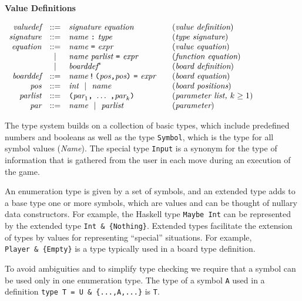 \documentclass[11pt]{article}
\makeatletter
\newcommand{\prodName}[1]{&(\emph{#1})\\}
\newcommand{\nt}[1]{\textit{#1}}
\newcommand{\prog}[1]{\texttt{#1}}
\newcommand{\ORil}{\ \ |\ \ }
\newcommand{\IS}{&::=&}
\newcommand{\OR}{&|&}
\newcommand{\syntax}[2]{
  \needspace{3\baselineskip}
  \bigskip\par\noindent\textbf{#1}\par\smallskip%
  $\begin{array}{rcl@{\qquad}l}#2\end{array}$%
  \par\bigskip\noindent\ignorespaces
}
\newcommand{\lp}{\prog{(}}
\newcommand{\rp}{\prog{)}}
\newcommand{\paren}[1]{\lp#1\rp}
\newcommand{\pair}[2]{\paren{#1\prog{,}#2}}
\makeatother
\begin{document}
\syntax{Value Definitions}{
\nt{valuedef}  \IS \nt{signature}\ \nt{equation}   \prodName{value definition}
\nt{signature} \IS \nt{name}\ \prog{:}\ \nt{type}  \prodName{type signature}
\nt{equation}  \IS \nt{name}\ \prog{=}\ \nt{expr}  \prodName{value equation}
               \OR \nt{name}\ \nt{parlist}\ \prog{=}\ \nt{expr}
                   \prodName{function equation}
               \OR \nt{boarddef}^*                  \prodName{board definition}
\nt{boarddef}  \IS \nt{name}\,\prog{!}\,\pair{\nt{pos}}{\nt{pos}}\ \prog{=}\ \nt{expr}
                   \prodName{board equation}
\nt{pos}       \IS \nt{int} \ORil \nt{name}      \prodName{board positions}
\nt{parlist}   \IS \paren{\nt{par}_1\prog{,}\ \ldots\ \prog{,}\nt{par}_k}
                   \prodName{parameter list, $k\geq 1$}
\nt{par}       \IS \nt{name} \ORil \nt{parlist}   \prodName{parameter}
}
%
The type system builds on a collection of basic types, which include
predefined numbers and booleans as well as the type \prog{Symbol}, which is the
type for all symbol values (\nt{Name}).
%
%
The special type \prog{Input} is a synonym for the type of information that is
gathered from the user in each move during an execution of the game.
%

An enumeration type is given by a set of symbols, and an  extended type adds to
a base type one or more symbols, which are values and can be thought of nullary
data constructors. For example, the Haskell type \prog{Maybe Int} can be
represented by the extended type \prog{Int~\&~\{Nothing\}}. Extended types
facilitate the extension of types by values for representing ``special''
situations. For example, \prog{Player~\&~\{Empty\}} is a type typically used in
a board type definition.

To avoid ambiguities and to simplify type checking we require that a symbol can
be used only in one enumeration type. The type of a symbol \prog{A} used in a definition \prog{type~T~=~U~\&~\{...,A,...\}} is \prog{T}.
\end{document}
